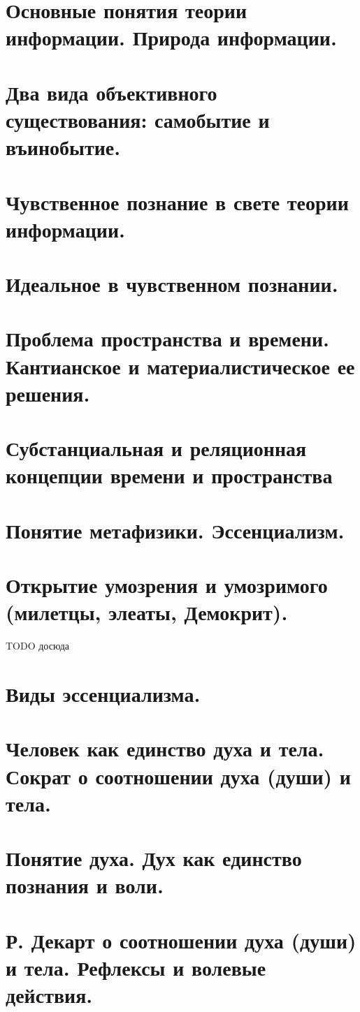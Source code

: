 \section{ Основные понятия теории информации. Природа информации.}
\section{ Два вида объективного существования: самобытие и въинобытие.}
\section{ Чувственное познание в свете теории информации.}
\section{ Идеальное в чувственном познании.}
\section{ Проблема пространства и времени. Кантианское и материалистическое ее решения.}
\section{ Субстанциальная и реляционная концепции времени и пространства}
\section{ Понятие метафизики. Эссенциализм.}
\section{ Открытие умозрения и умозримого (милетцы, элеаты, Демокрит).}

TODO досюда

\section{ Виды эссенциализма.}
\section{ Человек как единство духа и тела. Сократ о соотношении духа (души) и тела.}
\section{ Понятие духа. Дух как единство познания и воли.}
\section{ Р. Декарт о соотношении духа (души) и тела. Рефлексы и волевые действия.}
